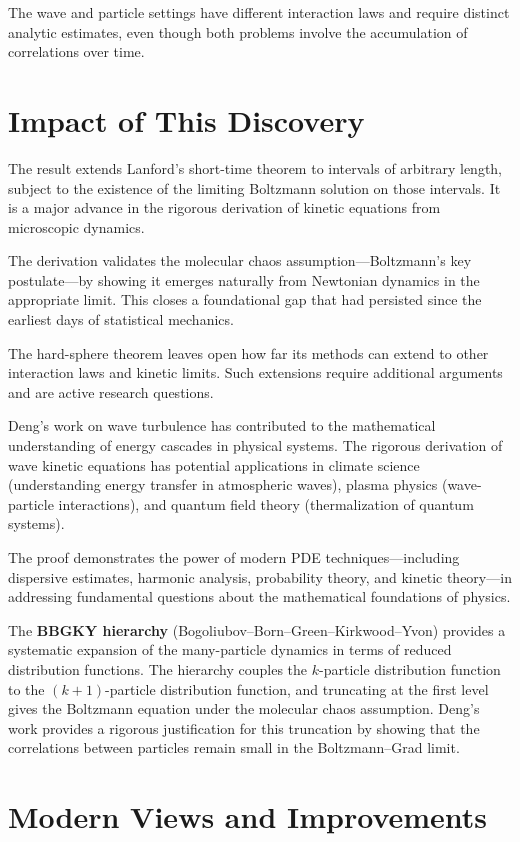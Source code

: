The wave and particle settings have different interaction laws and require distinct analytic estimates, even though both problems involve the accumulation of correlations over time.

\section{Impact of This Discovery}

The result extends Lanford's short-time theorem to intervals of arbitrary length, subject to the existence of the limiting Boltzmann solution on those intervals. It is a major advance in the rigorous derivation of kinetic equations from microscopic dynamics.

The derivation validates the molecular chaos assumption---Boltzmann's key postulate---by showing it emerges naturally from Newtonian dynamics in the appropriate limit. This closes a foundational gap that had persisted since the earliest days of statistical mechanics.

The hard-sphere theorem leaves open how far its methods can extend to other interaction laws and kinetic limits. Such extensions require additional arguments and are active research questions.

Deng's work on wave turbulence has contributed to the mathematical understanding of energy cascades in physical systems. The rigorous derivation of wave kinetic equations has potential applications in climate science (understanding energy transfer in atmospheric waves), plasma physics (wave-particle interactions), and quantum field theory (thermalization of quantum systems).

The proof demonstrates the power of modern PDE techniques---including dispersive estimates, harmonic analysis, probability theory, and kinetic theory---in addressing fundamental questions about the mathematical foundations of physics.

The \textbf{BBGKY hierarchy} (Bogoliubov--Born--Green--Kirkwood--Yvon) provides a systematic expansion of the many-particle dynamics in terms of reduced distribution functions. The hierarchy couples the $k$-particle distribution function to the $(k+1)$-particle distribution function, and truncating at the first level gives the Boltzmann equation under the molecular chaos assumption. Deng's work provides a rigorous justification for this truncation by showing that the correlations between particles remain small in the Boltzmann--Grad limit.

\section{Modern Views and Improvements}

